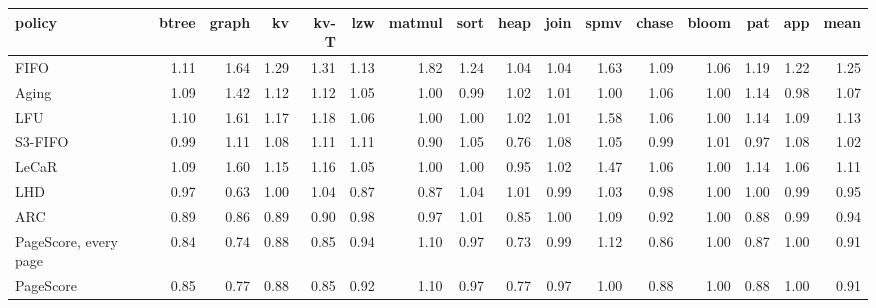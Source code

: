 \begin{tabular}{lrrrrrrrrrrrrrrr}
\toprule
policy & btree & graph & kv & kv-T & lzw & matmul & sort & heap & join & spmv & chase & bloom & pat & app & mean \\
\midrule
FIFO & 1.11 & 1.64 & 1.29 & 1.31 & 1.13 & 1.82 & 1.24 & 1.04 & 1.04 & 1.63 & 1.09 & 1.06 & 1.19 & 1.22 & 1.25 \\
Aging & 1.09 & 1.42 & 1.12 & 1.12 & 1.05 & 1.00 & 0.99 & 1.02 & 1.01 & 1.00 & 1.06 & 1.00 & 1.14 & 0.98 & 1.07 \\
LFU & 1.10 & 1.61 & 1.17 & 1.18 & 1.06 & 1.00 & 1.00 & 1.02 & 1.01 & 1.58 & 1.06 & 1.00 & 1.14 & 1.09 & 1.13 \\
S3-FIFO & 0.99 & 1.11 & 1.08 & 1.11 & 1.11 & 0.90 & 1.05 & 0.76 & 1.08 & 1.05 & 0.99 & 1.01 & 0.97 & 1.08 & 1.02 \\
LeCaR & 1.09 & 1.60 & 1.15 & 1.16 & 1.05 & 1.00 & 1.00 & 0.95 & 1.02 & 1.47 & 1.06 & 1.00 & 1.14 & 1.06 & 1.11 \\
LHD & 0.97 & 0.63 & 1.00 & 1.04 & 0.87 & 0.87 & 1.04 & 1.01 & 0.99 & 1.03 & 0.98 & 1.00 & 1.00 & 0.99 & 0.95 \\
ARC & 0.89 & 0.86 & 0.89 & 0.90 & 0.98 & 0.97 & 1.01 & 0.85 & 1.00 & 1.09 & 0.92 & 1.00 & 0.88 & 0.99 & 0.94 \\
PageScore, every page & 0.84 & 0.74 & 0.88 & 0.85 & 0.94 & 1.10 & 0.97 & 0.73 & 0.99 & 1.12 & 0.86 & 1.00 & 0.87 & 1.00 & 0.91 \\
PageScore & 0.85 & 0.77 & 0.88 & 0.85 & 0.92 & 1.10 & 0.97 & 0.77 & 0.97 & 1.00 & 0.88 & 1.00 & 0.88 & 1.00 & 0.91 \\
\bottomrule
\end{tabular}
